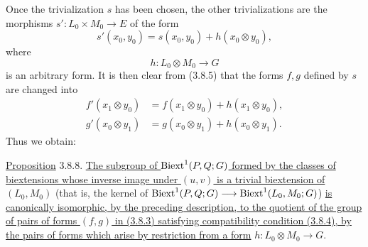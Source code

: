 Once the trivialization $s$ has been chosen, the other
trivializations are the morphisms
$s':L_0\times M_0\longrightarrow E$ of the form
\begin{equation}\tag{3.8.6}
 s'(x_0,y_0)=s(x_0,y_0)+h(x_0\otimes y_0),
\end{equation}
where
\[
 h:L_0\otimes M_0\longrightarrow G
\]
is an arbitrary form.  It is then clear from (3.8.5) that the forms
$f,g$ defined by $s$ are changed into
\begin{equation}\tag{3.8.7}
\begin{aligned}
 f'(x_1\otimes y_0)&=f(x_1\otimes y_0)+h(x_1\otimes y_0),\\
 g'(x_0\otimes y_1)&=g(x_0\otimes y_1)+h(x_0\otimes y_1).
\end{aligned}
\end{equation}
Thus we obtain:

\underline{Proposition} 3.8.8.
\underline{The subgroup of $\operatorname{Biext}^1(P,Q;G)$ formed by the classes
of biextensions whose inverse image under $(u,v)$ is a trivial
biextension of $(L_0,M_0)$} (that is, the kernel of
$\operatorname{Biext}^1(P,Q;G)\longrightarrow\operatorname{Biext}^1(L_0,M_0;G)$)
\underline{is canonically isomorphic, by the preceding description,
to the quotient of the group of pairs of forms $(f,g)$ in (3.8.3)
satisfying compatibility condition (3.8.4), by the pairs of forms
which arise by restriction from a form}
$h:L_0\otimes M_0\longrightarrow G$.

